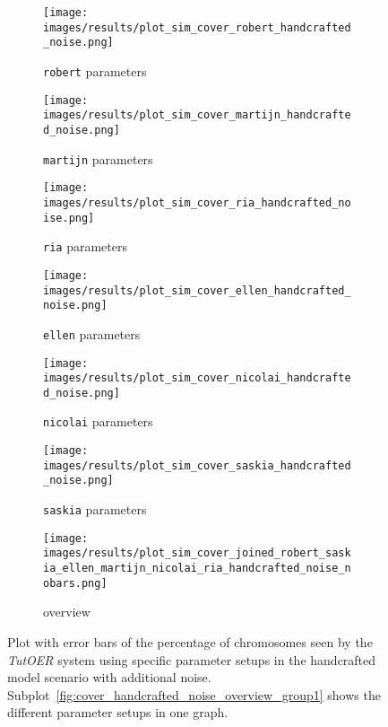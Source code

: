 \begin{figure}[ht]
	\begin{subfigure}{0.48\linewidth}
	\texttt{[image: images/results/plot\_sim\_cover\_robert\_handcrafted\_noise.png]}
	\caption{\texttt{robert} parameters}
	\label{fig:cover_handcrafted_noise_robert}
	\end{subfigure}
	\hfill
	\begin{subfigure}{0.48\linewidth}
	\texttt{[image: images/results/plot\_sim\_cover\_martijn\_handcrafted\_noise.png]}
	\caption{\texttt{martijn} parameters}
	\label{fig:cover_handcrafted_noise_martijn}
	\end{subfigure}
	\begin{subfigure}{0.48\linewidth}
	\texttt{[image: images/results/plot\_sim\_cover\_ria\_handcrafted\_noise.png]}
	\caption{\texttt{ria} parameters}
	\label{fig:cover_handcrafted_noise_ria}
	\end{subfigure}
	\hfill
	\begin{subfigure}{0.48\linewidth}
	\texttt{[image: images/results/plot\_sim\_cover\_ellen\_handcrafted\_noise.png]}
	\caption{\texttt{ellen} parameters}
	\label{fig:cover_handcrafted_noise_ellen}
	\end{subfigure}
	\begin{subfigure}{0.48\linewidth}
	\texttt{[image: images/results/plot\_sim\_cover\_nicolai\_handcrafted\_noise.png]}
	\caption{\texttt{nicolai} parameters}
	\label{fig:cover_handcrafted_noise_nicolai}
	\end{subfigure}
	\hfill
	\begin{subfigure}{0.48\linewidth}
	\texttt{[image: images/results/plot\_sim\_cover\_saskia\_handcrafted\_noise.png]}
	\caption{\texttt{saskia} parameters}
	\label{fig:cover_handcrafted_noise_saskia}
	\end{subfigure}
	\begin{subfigure}{\linewidth}
	\texttt{[image: images/results/plot\_sim\_cover\_joined\_robert\_saskia\_ellen\_martijn\_nicolai\_ria\_handcrafted\_noise\_nobars.png]}
	\caption{overview}
	\label{fig:cover_handcrafted_noise_overview_group2}
	\end{subfigure}
	\caption{Plot with error bars of the percentage of chromosomes seen by the \emph{TutOER}
	system using specific parameter setups in the handcrafted model scenario
	with additional noise.
	Subplot~\ref{fig:cover_handcrafted_noise_overview_group1} shows the
	different parameter setups in one graph.}
	\label{fig:cover_handcrafted_noise_container_group2}
\end{figure}
